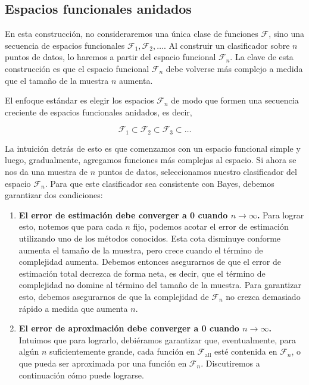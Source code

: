 \documentclass{report}
\begin{document}
\subsection{Espacios funcionales anidados}

En esta construcción, no consideraremos una única clase de funciones \(\mathcal{F}\), sino una
secuencia de espacios funcionales \(\mathcal{F}_1, \mathcal{F}_2, \dots\). Al construir un
clasificador sobre \(n\) puntos de datos, lo haremos a partir del espacio funcional \(\mathcal{F}_n\).
La clave de esta construcción es que el espacio funcional \(\mathcal{F}_n\) debe volverse más
complejo a medida que el tamaño de la muestra \(n\) aumenta.

El enfoque estándar es elegir los espacios \(\mathcal{F}_n\) de modo que formen una secuencia
creciente de espacios funcionales anidados, es decir,

\[
\mathcal{F}_1 \subset \mathcal{F}_2 \subset \mathcal{F}_3 \subset \dots
\]

La intuición detrás de esto es que comenzamos con un espacio funcional simple y luego,
gradualmente, agregamos funciones más complejas al espacio. Si ahora se nos da una muestra
de \(n\) puntos de datos, seleccionamos nuestro clasificador del espacio \(\mathcal{F}_n\).
Para que este clasificador sea consistente con Bayes, debemos garantizar dos condiciones:

\begin{enumerate}
    \item \textbf{El error de estimación debe converger a 0 cuando \(n \to \infty\).} Para lograr esto,
    notemos que para cada \(n\) fijo, podemos acotar el error de estimación utilizando uno de los
    métodos conocidos. Esta cota disminuye conforme aumenta el tamaño de la muestra, pero
    crece cuando el término de complejidad aumenta. Debemos entonces asegurarnos de que el error de
    estimación total decrezca de forma neta, es decir, que el término de complejidad no domine al término
    del tamaño de la muestra. Para garantizar esto, debemos asegurarnos de que la complejidad de
    \(\mathcal{F}_n\) no crezca demasiado rápido a medida que aumenta \(n\).

    \item \textbf{El error de aproximación debe converger a 0 cuando \(n \to \infty\).} Intuimos que
    para lograrlo,
    debiéramos garantizar que, eventualmente, para algún \(n\) suficientemente grande, cada función en
    \(\mathcal{F}_{\text{all}}\) esté contenida en \(\mathcal{F}_n\), o que pueda ser aproximada por
    una función en \(\mathcal{F}_n\). Discutiremos a continuación cómo puede lograrse.
\end{enumerate}
\end{document}
